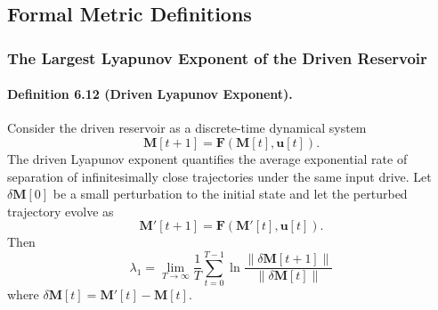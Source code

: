 \subsection{Formal Metric Definitions}

\subsubsection{The Largest Lyapunov Exponent of the Driven Reservoir}

\paragraph{Definition 6.12 (Driven Lyapunov Exponent).}
Consider the driven reservoir as a discrete-time dynamical system
\begin{equation}
\mathbf{M}[t+1]=\mathbf{F}(\mathbf{M}[t],\mathbf{u}[t]).
\end{equation}
The driven Lyapunov exponent quantifies the average exponential rate of separation of infinitesimally close trajectories under the same input drive. Let $\delta \mathbf{M}[0]$ be a small perturbation to the initial state and let the perturbed trajectory evolve as
\begin{equation}
\mathbf{M}'[t+1]=\mathbf{F}(\mathbf{M}'[t],\mathbf{u}[t]).
\end{equation}
Then
\begin{equation}
\lambda_1 = \lim_{T\to\infty}\frac{1}{T}\sum_{t=0}^{T-1}\ln\frac{\lVert \delta \mathbf{M}[t+1]\rVert}{\lVert \delta \mathbf{M}[t]\rVert}
\end{equation}
where $\delta \mathbf{M}[t]=\mathbf{M}'[t]-\mathbf{M}[t]$.

